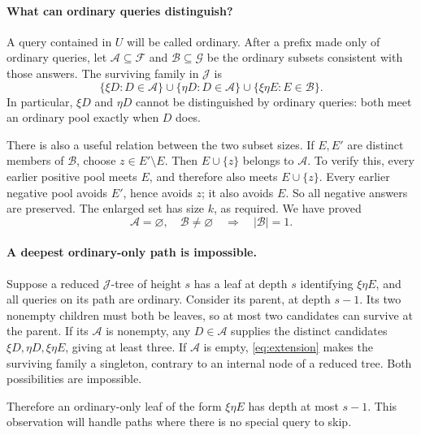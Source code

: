 \documentclass[11pt]{article}
\theoremstyle{definition}
\theoremstyle{remark}
\numberwithin{equation}{section}
\begin{document}
\paragraph{What can ordinary queries distinguish?}
A query contained in \(U\) will be called ordinary.
After a prefix made only of ordinary queries, let
\(\mathcal A\subseteq\mathcal F\) and
\(\mathcal B\subseteq\mathcal G\) be the ordinary subsets consistent
with those answers. The surviving family in \(\mathcal J\) is
\begin{equation}\label{eq:ordinaryfamily}
 \{\xi D:D\in\mathcal A\}
 \cup\{\eta D:D\in\mathcal A\}
 \cup\{\xi\eta E:E\in\mathcal B\}.
\end{equation}
In particular, \(\xi D\) and \(\eta D\) cannot be distinguished by
ordinary queries: both meet an ordinary pool exactly when \(D\) does.

There is also a useful relation between the two subset sizes.
If \(E,E'\) are distinct members of \(\mathcal B\), choose
\(z\in E'\setminus E\). Then \(E\cup\{z\}\) belongs to
\(\mathcal A\). To verify this, every earlier positive pool meets
\(E\), and therefore also meets \(E\cup\{z\}\).
Every earlier negative pool avoids \(E'\), hence avoids \(z\);
it also avoids \(E\). So all negative answers are preserved.
The enlarged set has size \(k\), as required. We have proved
\begin{equation}\label{eq:extension}
 \mathcal A=\varnothing,\quad \mathcal B\ne\varnothing
 \quad\Longrightarrow\quad |\mathcal B|=1.
\end{equation}

\paragraph{A deepest ordinary-only path is impossible.}
Suppose a reduced \(\mathcal J\)-tree of height \(s\) has a leaf
at depth \(s\) identifying \(\xi\eta E\), and all queries on its
path are ordinary. Consider its parent, at depth \(s-1\).
Its two nonempty children must both be leaves, so at most two
candidates can survive at the parent.
If its \(\mathcal A\) is nonempty, any \(D\in\mathcal A\) supplies
the distinct candidates \(\xi D,\eta D,\xi\eta E\), giving at
least three. If \(\mathcal A\) is empty, \eqref{eq:extension}
makes the surviving family a singleton, contrary to an internal
node of a reduced tree. Both possibilities are impossible.

Therefore an ordinary-only leaf of the form \(\xi\eta E\) has
depth at most \(s-1\). This observation will handle paths where
there is no special query to skip.
\end{document}

